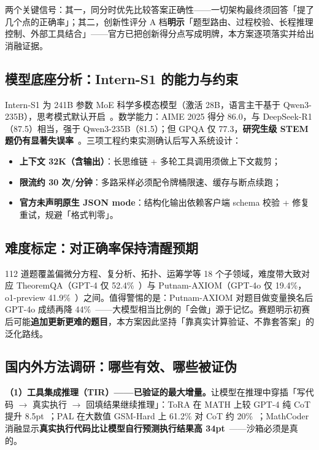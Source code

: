 \documentclass[11pt, a4paper]{ctexart}
\newcommand{\hl}[1]{\textcolor{accentred}{\textbf{#1}}}
\begin{document}
两个关键信号：其一，同分时优先比较答案正确性——一切架构最终须回答「提了几个点的正确率」；其二，创新性评分 A 档\hl{明示}「题型路由、过程校验、长程推理控制、外部工具结合」——官方已把创新得分点写成明牌，本方案逐项落实并给出消融证据。

\subsection{模型底座分析：Intern-S1 的能力与约束}

Intern-S1 为 241B 参数 MoE 科学多模态模型（激活 28B，语言主干基于 Qwen3-235B），思考模式默认开启~\cite{interns1}。数学能力：AIME 2025 得分 86.0，与 DeepSeek-R1（87.5）相当，强于 Qwen3-235B（81.5）；但 GPQA 仅 77.3，\hl{研究生级 STEM 题仍有显著失误率}~\cite{interns1}。三项工程约束实测确认后写入系统设计：

\begin{itemize}[itemsep=0.1em]
  \item \hl{上下文 32K（含输出）}：长思维链 + 多轮工具调用须做上下文裁剪；
  \item \hl{限流约 30 次/分钟}：多路采样必须配令牌桶限速、缓存与断点续跑；
  \item \hl{官方未声明原生 JSON mode}：结构化输出依赖客户端 schema 校验 + 修复重试，规避「格式判零」。
\end{itemize}

\subsection{难度标定：对正确率保持清醒预期}

112 道题覆盖偏微分方程、复分析、拓扑、运筹学等 18 个子领域，难度带大致对应 TheoremQA（GPT-4 仅 52.4\%~\cite{theoremqa}）与 Putnam-AXIOM（GPT-4o 仅 19.4\%，o1-preview 41.9\%~\cite{putnam}）之间。值得警惕的是：Putnam-AXIOM 对题目做变量换名后 GPT-4o 成绩再降 44\%~\cite{putnam}——大模型相当比例的「会做」源于记忆。赛题明示初赛后可能\hl{追加更新更难的题目}，本方案因此坚持「靠真实计算验证、不靠套答案」的泛化路线。

\subsection{国内外方法调研：哪些有效、哪些被证伪}

\textbf{（1）工具集成推理（TIR）——已验证的最大增量。}让模型在推理中穿插「写代码 $\rightarrow$ 真实执行 $\rightarrow$ 回填结果继续推理」：ToRA 在 MATH 上较 GPT-4 纯 CoT 提升 8.5pt~\cite{tora}；PAL 在大数值 GSM-Hard 上 61.2\% 对 CoT 约 20\%~\cite{pal}；MathCoder 消融显示\hl{真实执行代码比让模型自行预测执行结果高 34pt}~\cite{mathcoder}——沙箱必须是真的。
\end{document}
